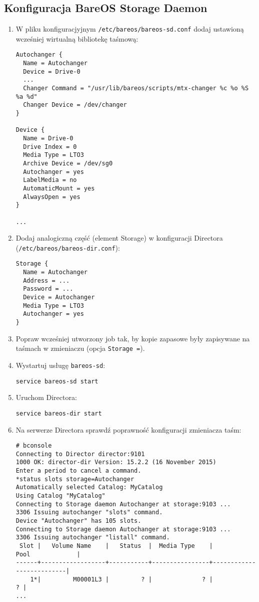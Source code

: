 \documentclass[polish]{article}
\begin{document}
\subsection*{Konfiguracja BareOS Storage Daemon}

\begin{enumerate}

\item W pliku konfiguracjyjnym \texttt{/etc/bareos/bareos-sd.conf} dodaj ustawioną wcześniej wirtualną bibliotekę taśmową:
\begin{verbatim}
Autochanger {
  Name = Autochanger
  Device = Drive-0
  ...
  Changer Command = "/usr/lib/bareos/scripts/mtx-changer %c %o %S %a %d"
  Changer Device = /dev/changer
}

Device {
  Name = Drive-0
  Drive Index = 0
  Media Type = LTO3
  Archive Device = /dev/sg0
  Autochanger = yes
  LabelMedia = no
  AutomaticMount = yes
  AlwaysOpen = yes
}

...
\end{verbatim}

\item Dodaj analogiczną część (element Storage) w konfiguracji Directora (\texttt{/etc/bareos/bareos-dir.conf}):
\begin{verbatim}
Storage {
  Name = Autochanger
  Address = ...
  Password = ...
  Device = Autochanger
  Media Type = LTO3
  Autochanger = yes
}
\end{verbatim}

\item Popraw wcześniej utworzony job tak, by kopie zapasowe były zapisywane na taśmach w zmieniaczu (opcja \texttt{Storage =}).

\item Wystartuj usługę \texttt{bareos-sd}:
\begin{verbatim}
service bareos-sd start
\end{verbatim}

\item Uruchom Directora:
\begin{verbatim}
service bareos-dir start
\end{verbatim}

\item Na serwerze Directora sprawdź poprawność konfiguracji zmieniacza taśm:
\begin{verbatim}
# bconsole
Connecting to Director director:9101
1000 OK: director-dir Version: 15.2.2 (16 November 2015)
Enter a period to cancel a command.
*status slots storage=Autochanger
Automatically selected Catalog: MyCatalog
Using Catalog "MyCatalog"
Connecting to Storage daemon Autochanger at storage:9103 ...
3306 Issuing autochanger "slots" command.
Device "Autochanger" has 105 slots.
Connecting to Storage daemon Autochanger at storage:9103 ...
3306 Issuing autochanger "listall" command.
 Slot |   Volume Name    |   Status  |  Media Type    |         Pool             |
------+------------------+-----------+----------------+--------------------------|
    1*|         M00001L3 |         ? |              ? |                        ? |
...
\end{verbatim}


\end{enumerate}
\end{document}
